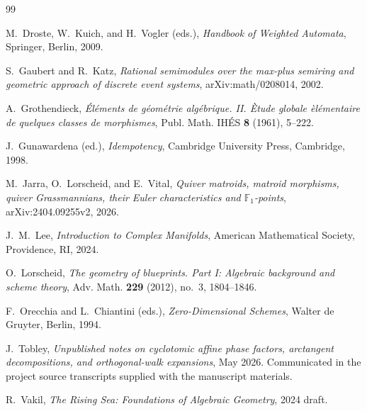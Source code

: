 \documentclass[11pt,a4paper]{article}
\theoremstyle{definition}
\theoremstyle{remark}
\begin{document}
\begin{thebibliography}{99}

M.~Droste, W.~Kuich, and H.~Vogler (eds.),
\emph{Handbook of Weighted Automata},
Springer, Berlin, 2009.

S.~Gaubert and R.~Katz,
\emph{Rational semimodules over the max-plus semiring and geometric approach of discrete event systems},
arXiv:math/0208014, 2002.

A.~Grothendieck,
\emph{\'El\'ements de g\'eom\'etrie alg\'ebrique. II. \`Etude globale \`el\'ementaire de quelques classes de morphismes},
Publ. Math. IH\'ES \textbf{8} (1961), 5--222.

J.~Gunawardena (ed.),
\emph{Idempotency},
Cambridge University Press, Cambridge, 1998.

M.~Jarra, O.~Lorscheid, and E.~Vital,
\emph{Quiver matroids, matroid morphisms, quiver Grassmannians, their Euler characteristics and $\mathbb F_1$-points},
arXiv:2404.09255v2, 2026.

J.~M.~Lee,
\emph{Introduction to Complex Manifolds},
American Mathematical Society, Providence, RI, 2024.

O.~Lorscheid,
\emph{The geometry of blueprints. Part I: Algebraic background and scheme theory},
Adv. Math. \textbf{229} (2012), no.~3, 1804--1846.

F.~Orecchia and L.~Chiantini (eds.),
\emph{Zero-Dimensional Schemes},
Walter de Gruyter, Berlin, 1994.

J.~Tobley,
\emph{Unpublished notes on cyclotomic affine phase factors, arctangent decompositions, and orthogonal-walk expansions},
May 2026.  Communicated in the project source transcripts supplied with the manuscript materials.

R.~Vakil,
\emph{The Rising Sea: Foundations of Algebraic Geometry},
2024 draft.

\end{thebibliography}
\end{document}
